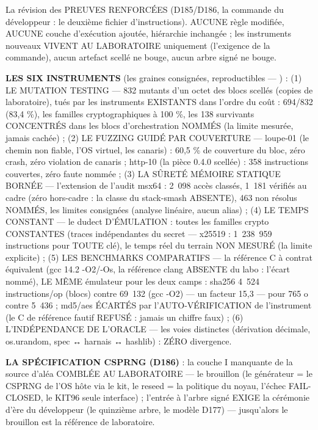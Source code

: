 La révision des PREUVES RENFORCÉES (D185/D186, la commande du développeur :
le deuxième fichier d'instructions). AUCUNE règle modifiée, AUCUNE couche
d'exécution ajoutée, hiérarchie inchangée ; les instruments nouveaux
VIVENT AU LABORATOIRE uniquement (l'exigence de la commande), aucun
artefact scellé ne bouge, aucun arbre signé ne bouge.

\textbf{LES SIX INSTRUMENTS} (les graines consignées, reproductibles —
) : (1) LE MUTATION TESTING — 832 mutants
d'un octet des blocs scellés (copies de laboratoire), tués par les
instruments EXISTANTS dans l'ordre du coût : 694/832 (83,4 \%), les
familles cryptographiques à 100 \%, les 138 survivants CONCENTRÉS dans
les blocs d'orchestration NOMMÉS (la limite mesurée, jamais cachée) ;
(2) LE FUZZING GUIDÉ PAR COUVERTURE — loupe-01 (le chemin non fiable,
l'OS virtuel, les canaris) : 60,5 \% de couverture du bloc, zéro crash,
zéro violation de canaris ; http-10 (la pièce 0.4.0 scellée) : 358
instructions couvertes, zéro faute nommée ; (3) LA SÛRETÉ MÉMOIRE
STATIQUE BORNÉE — l'extension de l'audit msx64 : 2~098 accès classés,
1~181 vérifiés au cadre (zéro hors-cadre : la classe du stack-smash
ABSENTE), 463 non résolus NOMMÉS, les limites consignées (analyse
linéaire, aucun alias) ; (4) LE TEMPS CONSTANT — le dudect
D'ÉMULATION : toutes les familles crypto CONSTANTES (traces
indépendantes du secret — x25519 : 1~238~959 instructions pour TOUTE
clé), le temps réel du terrain NON MESURÉ (la limite explicite) ;
(5) LES BENCHMARKS COMPARATIFS — la référence C à contrat équivalent
(gcc 14.2 -O2/-Os, la référence clang ABSENTE du labo : l'écart nommé),
LE MÊME émulateur pour les deux camps : sha256 4~524 instructions/op
(blocs) contre 69~132 (gcc -O2) — un facteur 15,3 — pour 765 o contre
5~436 ; md5/aes ÉCARTÉS par l'AUTO-VÉRIFICATION de l'instrument (le C
de référence fautif REFUSÉ : jamais un chiffre faux) ; (6)
L'INDÉPENDANCE DE L'ORACLE — les voies distinctes (dérivation décimale,
os.urandom, spec ↔ harnais ↔ hashlib) : ZÉRO divergence.

\textbf{LA SPÉCIFICATION CSPRNG (D186)} : la couche I manquante de la
source d'aléa COMBLÉE AU LABORATOIRE — le brouillon
 (le générateur = le CSPRNG de l'OS
hôte via le kit, le reseed = la politique du noyau, l'échec
FAIL-CLOSED, le KIT96 seule interface) ; l'entrée à l'arbre signé
EXIGE la cérémonie d'ère du développeur (le quinzième arbre, le modèle
D177) — jusqu'alors le brouillon est la référence de laboratoire.

